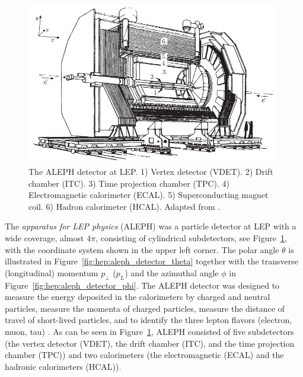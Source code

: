 \begin{figure}
  \centerfloat
  \includegraphics[width=0.99\textwidth]{figures/ALEPH/aleph.pdf}
  \caption[The ALEPH detector]{The ALEPH detector at LEP. 1) Vertex detector (VDET). 2) Drift chamber (ITC). 3) Time projection chamber (TPC). 4) Electromagnetic calorimeter (ECAL). 5) Superconducting magnet coil. 6) Hadron calorimeter (HCAL). Adapted from \citet{buskulicInvestigationBd0Bs01994}.}
  \label{fig:hep:aleph_detector}
\end{figure}

The \emph{apparatus for LEP physics} (ALEPH) was a particle detector at LEP with a wide coverage, almost $4 \pi$, consisting of cylindrical subdetectors, see Figure~\ref{fig:hep:aleph_detector}, with the coordinate system shown in the upper left corner. The polar angle $\theta$ is illustrated in Figure~\ref{fig:hep:aleph_detector_theta} together with the transverse (longitudinal) momentum $p_\perp$ ($p_L$) and the azimuthal angle $\phi$ in Figure~\ref{fig:hep:aleph_detector_phi}. The ALEPH detector was designed to measure the energy deposited in the calorimeters by charged and neutral particles, measure the momenta of charged particles, measure the distance of travel of short-lived particles, and to identify the three lepton flavors (electron, muon, tau) \autocite{buskulicInvestigationBd0Bs01994}. As can be seen in Figure~\ref{fig:hep:aleph_detector}, ALEPH consisted of five subdetectors (the vertex detector (VDET), the drift chamber (ITC), and the time projection chamber (TPC)) and two calorimeters (the electromagnetic (ECAL) and the hadronic calorimeters (HCAL)). 

